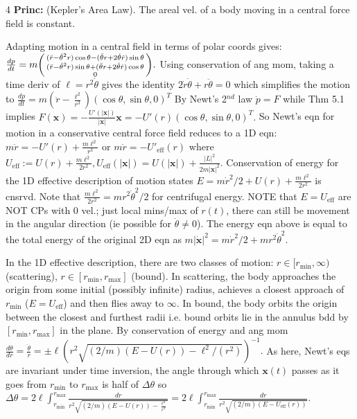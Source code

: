 \documentclass[landscape, 8pt]{extarticle}
\begin{document}
\begin{multicols*}{4}
		\textbf{Princ:} (Kepler's Area Law). The areal vel. of a body moving in a central force field is constant.
		
		Adapting motion in a central field in terms of polar coords gives:
		$
		\frac{dp}{dt}=m\begin{psmallmatrix*}(\ddot{r}-\dot\theta^2 r)\cos\theta - (\ddot\theta r+2\dot\theta\dot{r})\sin\theta\\
			(\ddot{r}-\dot\theta^2 r)\sin\theta + (\ddot\theta r+2\dot\theta\dot{r})\cos\theta\\ 0\end{psmallmatrix*}.
		$
		Using conservation of ang mom, taking a time deriv of $\ell=r^2\dot\theta$ gives the identity $2\dot{r}\dot\theta+r\ddot\theta=0$ which simplifies the motion to
		$
		\frac{dp}{dt}=m\!\left(\ddot{r}-\frac{\ell^2}{r^3}\right)(\cos \theta, \sin \theta, 0)^T
		$
		By Newt's 2$^{nd}$ law $\dot{p}=F$ while Thm 5.1 implies
		$
		F(\mathbf{x})=-\frac{U'(|\mathbf{x}|)}{|\mathbf{x}|}\mathbf{x}=-U'(r)(\cos\theta, \sin\theta, 0)^T.
		$
		So Newt's eqn for motion in a conservative central force field reduces to a 1D eqn:
		$
		m\ddot{r}=-U'(r)+\frac{m\ell^2}{r^3}\text{ or } m\ddot{r}=-U'_{\mathrm{eff}}(r)
		$
		where
		$
		U_{\mathrm{eff}}:=U(r)+\frac{m\ell^2}{2r^2}, U_{\mathrm{eff}}(|\mathbf{x}|)=U(|\mathbf{x}|)+\frac{|L|^2}{2m|\mathbf{x}|^2}.
		$
		Conservation of energy for the 1D effective description of motion states $E=m\dot{r}^2/2+U(r)+\frac{m\ell^2}{2r^2}$ is cnsrvd. Note that $\frac{m\ell^2}{2r^2}=mr^2\dot\theta^2/2$ for centrifugal energy. NOTE that $E=U_{\mathrm{eff}}$ are NOT CPs with 0 vel.; just local mins/max of $r(t)$, there can still be movement in the angular direction (ie possible for $\dot\theta \ne 0$). The energy eqn above is equal to the total energy of the original 2D eqn as $m|\dot{\mathbf{x}}|^2=m\dot{r}^2/2+mr^2\dot\theta^2$.
		
		In the 1D effective description, there are two classes of motion: $r\in[r_{\min},\infty)$ (scattering), $r\in[r_{\min},r_{\max}]$ (bound). In scattering, the body approaches the origin from some initial (possibly infinite) radius, achieves a closest approach of $r_{\min}$ ($E=U_{\mathrm{eff}}$) and then flies away to $\infty$. In bound, the body orbits the origin between the closest and furthest radii i.e. bound orbits lie in the annulus bdd by $[r_{\min},r_{\max}]$ in the plane. By conservation of energy and ang mom
		$
		\frac{d\theta}{dr}=\frac{\dot\theta}{\dot{r}}=\pm \ell \left(r^2\sqrt{(2/m)(E-U(r))-\ell^2/(r^2)}\right)^{-1}.
		$
		As here, Newt's eqs are invariant under time inversion, the angle through which $\mathbf{x}(t)$ passes as it goes from $r_{\min}$ to $r_{\max}$ is half of $\Delta\theta$ so
		$
		\Delta\theta = 2\ell\int_{r_{\min}}^{r_{\max}}\frac{dr}{r^2\sqrt{(2/m)(E-U(r))-\frac{\ell^2}{r^2}}}
		=2\ell\int_{r_{\min}}^{r_{\max}}\frac{dr}{r^2\sqrt{(2/m)(E-U_{\mathrm{eff}}(r))}}.
		$
		

\end{multicols*}
\end{document}

